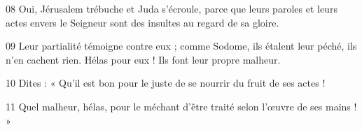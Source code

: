 
08 Oui, Jérusalem trébuche et Juda s’écroule, parce que leurs paroles et leurs actes envers le Seigneur sont des insultes au regard de sa gloire.

09 Leur partialité témoigne contre eux ; comme Sodome, ils étalent leur péché, ils n’en cachent rien. Hélas pour eux ! Ils font leur propre malheur.

10 Dites : « Qu’il est bon pour le juste de se nourrir du fruit de ses actes !

11 Quel malheur, hélas, pour le méchant d’être traité selon l’œuvre de ses mains ! »